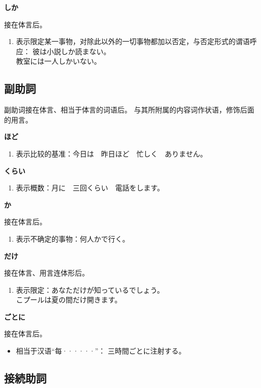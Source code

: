 {\bf
\noindent しか
}

接在体言后。
\begin{enumerate}
  \item 表示限定某一事物，对除此以外的一切事物都加以否定，与否定形式的谓语呼应：
    彼は小説しか読まない。\\
    教室には一人しかいない。
\end{enumerate}


\subsection{副助詞}%

副助词接在体言、相当于体言的词语后。
与其所附属的内容词作状语，修饰后面的用言。

{\bf
\noindent ほど
}

\begin{enumerate}
  \item 表示比较的基准：今日は　昨日ほど　忙しく　ありません。
\end{enumerate}

{\bf
\noindent くらい 
}

\begin{enumerate}
  \item 表示概数：月に　三回くらい　電話をします。
\end{enumerate}

{\bf
\noindent か
}

接在体言后。
\begin{enumerate}
  \item 表示不确定的事物：何人かで行く。
\end{enumerate}

{\bf
\noindent だけ
}

接在体言、用言连体形后。
\begin{enumerate}
  \item 表示限定：あなただけが知っているでしょう。\\
    こプールは夏の間だけ開きます。
\end{enumerate}

{\bf
\noindent ごとに
}

接在体言后。
\begin{itemize}
  \item 相当于汉语``每······''： 三時間ごとに注射する。
\end{itemize}


\subsection{接続助詞}%

